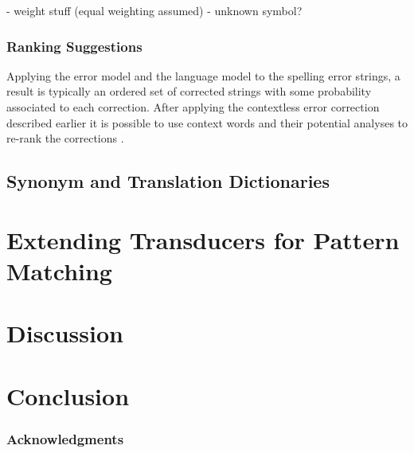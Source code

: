 \documentclass{llncs}
\begin{document}
- weight stuff (equal weighting assumed)
- unknown symbol?

\subsubsection{Ranking Suggestions}

Applying the error model and the language model to the spelling error strings,
a result is typically an ordered set of corrected strings with some probability
associated to each correction. After applying the contextless error correction
described earlier it is possible to use context words and their potential
analyses to re-rank the corrections \cite{pirinen/cicling/2012}.

\subsection{Synonym and Translation Dictionaries}

\section{Extending Transducers for Pattern Matching}

\section{Discussion}

\section{Conclusion}

\subsubsection*{Acknowledgments}




\end{document}
